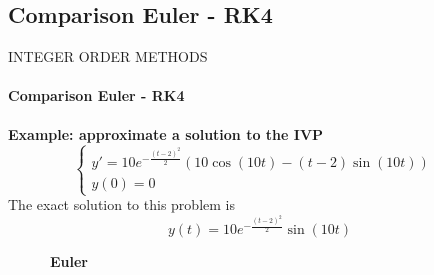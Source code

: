 \subsection{Comparison Euler - RK4}
\begin{frame}{INTEGER ORDER METHODS}
    \framesubtitle{Comparison Euler - RK4}
    \textbf{Example: approximate a solution to the IVP} 
    \begin{equation}
    \begin{cases}
        y' = 10e^{-\frac{(t-2)^2}{2}}\left(10\cos(10t)-(t-2)\sin(10t)\right)&\\ 
        y(0) = 0&
    \end{cases}
    \end{equation}
The exact solution to this problem is
\begin{equation}
    y(t) = 10e^{-\frac{(t-2)^2}{2}}\sin(10t)
\end{equation}
\begin{multicols}{2}
$\qquad\quad$\textbf{Euler}\begin{figure}[H]
        \centering

\end{figure}
\end{multicols}
\end{frame}

